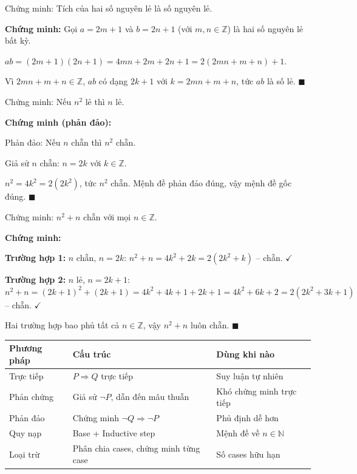 \documentclass[12pt,a4paper]{article}
\begin{document}
\begin{vidu}[title={Chứng minh trực tiếp -- tích hai số lẻ là số lẻ}]
  Chứng minh: Tích của hai số nguyên lẻ là số nguyên lẻ.

  \medskip\textbf{Chứng minh:}
  Gọi $a = 2m+1$ và $b = 2n+1$ (với $m,n\in\mathbb{Z}$) là hai số nguyên lẻ bất kỳ.

  $ab = (2m+1)(2n+1) = 4mn+2m+2n+1 = 2(2mn+m+n)+1$.

  Vì $2mn+m+n \in \mathbb{Z}$, $ab$ có dạng $2k+1$ với $k = 2mn+m+n$, tức $ab$ là số lẻ. $\blacksquare$
\end{vidu}

\begin{vidu}[title={Chứng minh phản đảo}]
  Chứng minh: Nếu $n^2$ lẻ thì $n$ lẻ.

  \medskip\textbf{Chứng minh (phản đảo):}

  Phản đảo: Nếu $n$ chẵn thì $n^2$ chẵn.

  Giả sử $n$ chẵn: $n = 2k$ với $k\in\mathbb{Z}$.

  $n^2 = 4k^2 = 2(2k^2)$, tức $n^2$ chẵn. Mệnh đề phản đảo đúng, vậy mệnh đề gốc đúng. $\blacksquare$
\end{vidu}

\begin{vidu}[title={Phép loại trừ -- chia trường hợp}]
  Chứng minh: $n^2 + n$ chẵn với mọi $n \in \mathbb{Z}$.

  \medskip\textbf{Chứng minh:}

  \textbf{Trường hợp 1:} $n$ chẵn, $n = 2k$: $n^2+n = 4k^2+2k = 2(2k^2+k)$ -- chẵn. $\checkmark$

  \textbf{Trường hợp 2:} $n$ lẻ, $n = 2k+1$: $n^2+n = (2k+1)^2+(2k+1) = 4k^2+4k+1+2k+1 = 4k^2+6k+2 = 2(2k^2+3k+1)$ -- chẵn. $\checkmark$

  Hai trường hợp bao phủ tất cả $n\in\mathbb{Z}$, vậy $n^2+n$ luôn chẵn. $\blacksquare$
\end{vidu}

\begin{congthuc}[title={Tóm tắt các phương pháp chứng minh}]
  \begin{tabular}{lll}
    \textbf{Phương pháp} & \textbf{Cấu trúc} & \textbf{Dùng khi nào} \\
    \hline
    Trực tiếp & $P \Rightarrow Q$ trực tiếp & Suy luận tự nhiên \\
    Phản chứng & Giả sử $\neg P$, dẫn đến mâu thuẫn & Khó chứng minh trực tiếp \\
    Phản đảo & Chứng minh $\neg Q \Rightarrow \neg P$ & Phủ định dễ hơn \\
    Quy nạp & Base + Inductive step & Mệnh đề về $n \in \mathbb{N}$ \\
    Loại trừ & Phân chia cases, chứng minh từng case & Số cases hữu hạn \\
  \end{tabular}
\end{congthuc}
\end{document}
